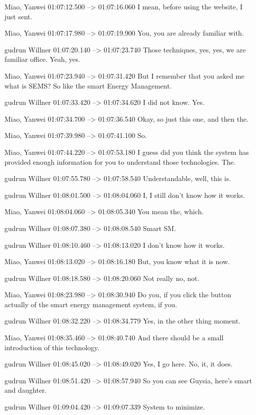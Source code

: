 {Miao, Yanwei 01:07:12.500 --> 01:07:16.060
I mean, before using the website, I just sent.

Miao, Yanwei 01:07:17.980 --> 01:07:19.900
You, you are already familiar with.

gudrun Willner 01:07:20.140 --> 01:07:23.740
Those techniques, yes, yes, we are familiar office. Yeah, yes.

Miao, Yanwei 01:07:23.940 --> 01:07:31.420
But I remember that you asked me what is SEMS? So like the smart Energy Management.

gudrun Willner 01:07:33.420 --> 01:07:34.620
I did not know. Yes.

Miao, Yanwei 01:07:34.700 --> 01:07:36.540
Okay, so just this one, and then the.

Miao, Yanwei 01:07:39.980 --> 01:07:41.100
So.

Miao, Yanwei 01:07:44.220 --> 01:07:53.180
I guess did you think the system has provided enough information for you to understand those technologies. The.

gudrun Willner 01:07:55.780 --> 01:07:58.540
Understandable, well, this is.

gudrun Willner 01:08:01.500 --> 01:08:04.060
I, I still don't know how it works.

Miao, Yanwei 01:08:04.060 --> 01:08:05.340
You mean the, which.

gudrun Willner 01:08:07.380 --> 01:08:08.540
Smart SM.

gudrun Willner 01:08:10.460 --> 01:08:13.020
I don't know how it works.

Miao, Yanwei 01:08:13.020 --> 01:08:16.180
But, you know what it is now.

gudrun Willner 01:08:18.580 --> 01:08:20.060
Not really no, not.

Miao, Yanwei 01:08:23.980 --> 01:08:30.940
Do you, if you click the button actually of the smart energy management system, if you.

gudrun Willner 01:08:32.220 --> 01:08:34.779
Yes, in the other thing moment.

Miao, Yanwei 01:08:35.460 --> 01:08:40.740
And there should be a small introduction of this technology.

gudrun Willner 01:08:45.020 --> 01:08:49.020
Yes, I go here. No, it, it does.

gudrun Willner 01:08:51.420 --> 01:08:57.940
So you can see Guysia, here's smart and daughter.

gudrun Willner 01:09:04.420 --> 01:09:07.339
System to minimize.

}
